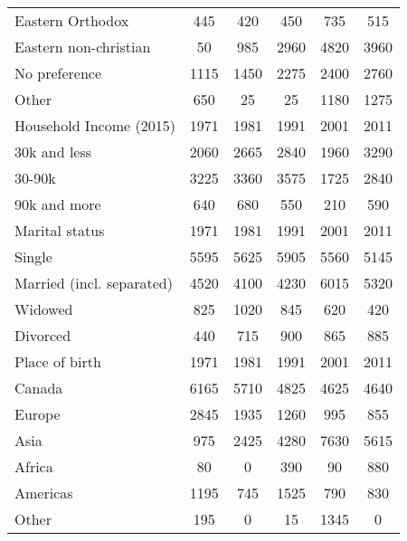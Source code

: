 \begin{tabular}{lccccc}
	 Eastern Orthodox & 445&420&450&735&515 \\
	 Eastern non-christian & 50&985&2960&4820&3960 \\
	 No preference & 1115&1450&2275&2400&2760 \\
	 Other & 650&25&25&1180&1275 \\
	\hline
	Household Income (2015)&1971&1981&1991&2001&2011\\
	\hline
	 30k and less & 2060&2665&2840&1960&3290 \\
	 30-90k & 3225&3360&3575&1725&2840 \\
	 90k and more & 640&680&550&210&590 \\
	\hline
	Marital status&1971&1981&1991&2001&2011\\
	\hline
	 Single & 5595&5625&5905&5560&5145 \\
	 Married (incl. separated) & 4520&4100&4230&6015&5320 \\
	 Widowed & 825&1020&845&620&420 \\
	 Divorced & 440&715&900&865&885 \\
	\hline
	Place of birth&1971&1981&1991&2001&2011\\
	\hline
	 Canada & 6165&5710&4825&4625&4640 \\
	 Europe & 2845&1935&1260&995&855 \\
	 Asia & 975&2425&4280&7630&5615 \\
	 Africa & 80&0&390&90&880 \\
	 Americas & 1195&745&1525&790&830 \\
	 Other & 195&0&15&1345&0 \\
\end{tabular}
